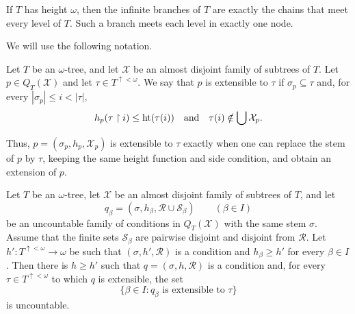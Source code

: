 If $T$ has height $\omega$, then the infinite branches of $T$ are exactly the
chains that meet every level of $T$.
Such a branch meets each level in exactly one node.

We will use the following notation.

\begin{definition}\label{def:QT-extensible}
  Let $T$ be an $\omega$-tree, and let $\mathcal X$ be an almost disjoint
  family of subtrees of $T$.
  Let $p\in Q_T(\mathcal X)$ and let
  $\tau\in T^{\uparrow<\omega}$.
  We say that $p$ is extensible to $\tau$ if $\sigma_p\subseteq\tau$ and, for every
  $|\sigma_p|\leq i<|\tau|$,
  \[
    h_p(\tau\restriction i)\leq\operatorname{ht}(\tau(i))
    \quad\text{and}\quad
    \tau(i)\notin\bigcup \mathcal X_p.
  \]
\end{definition}
Thus, $p=(\sigma_p,h_p,\mathcal X_p)$ is extensible to $\tau$ exactly when
one can replace the stem of $p$ by $\tau$, keeping the same height function and
side condition, and obtain an extension of $p$.

\begin{lemma}\label{lem:QT-preparation}
Let $T$ be an $\omega$-tree, let $\mathcal X$ be an almost disjoint family of
subtrees of $T$, and let
\[
  q_\beta=(\sigma,h_\beta,\mathcal R\cup\mathcal S_\beta)
  \qquad(\beta\in I)
\]
be an uncountable family of conditions in $Q_T(\mathcal X)$ with the same stem $\sigma$.
Assume that the finite sets $\mathcal S_\beta$ are pairwise
disjoint and disjoint from $\mathcal R$.
Let $h':T^{\uparrow<\omega}\to\omega$ be such that $(\sigma,h',\mathcal R)$ is a condition and $h_\beta\geq h'$ for every $\beta\in I$.
Then there is $h\geq h'$ such that $q=(\sigma,h,\mathcal R)$ is a condition
and, for every $\tau\in T^{\uparrow<\omega}$ to which $q$ is extensible, the set
\[
  \{\beta\in I:q_\beta\text{ is extensible to }\tau\}
\]
is uncountable.
\end{lemma}


